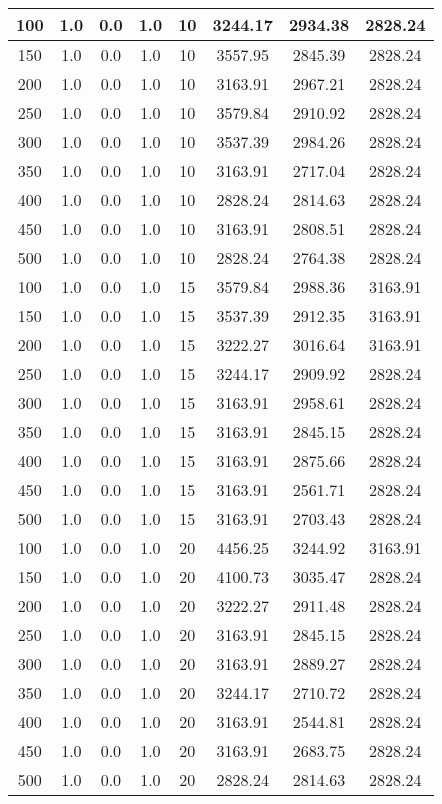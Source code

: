 \documentclass[a4paper, 12pt]{extreport}
\begin{document}
\begin{itemize}
\begin{longtable}{|c|c|c|c|c|c|c|c|}
			100 & 1.0 & 0.0 & 1.0 & 10 & 3244.17 & 2934.38 & 2828.24 \\\hline
			150 & 1.0 & 0.0 & 1.0 & 10 & 3557.95 & 2845.39 & 2828.24 \\\hline
			200 & 1.0 & 0.0 & 1.0 & 10 & 3163.91 & 2967.21 & 2828.24 \\\hline
			250 & 1.0 & 0.0 & 1.0 & 10 & 3579.84 & 2910.92 & 2828.24 \\\hline
			300 & 1.0 & 0.0 & 1.0 & 10 & 3537.39 & 2984.26 & 2828.24 \\\hline
			350 & 1.0 & 0.0 & 1.0 & 10 & 3163.91 & 2717.04 & 2828.24 \\\hline
			400 & 1.0 & 0.0 & 1.0 & 10 & 2828.24 & 2814.63 & 2828.24 \\\hline
			450 & 1.0 & 0.0 & 1.0 & 10 & 3163.91 & 2808.51 & 2828.24 \\\hline
			500 & 1.0 & 0.0 & 1.0 & 10 & 2828.24 & 2764.38 & 2828.24 \\\hline
			100 & 1.0 & 0.0 & 1.0 & 15 & 3579.84 & 2988.36 & 3163.91 \\\hline
			150 & 1.0 & 0.0 & 1.0 & 15 & 3537.39 & 2912.35 & 3163.91 \\\hline
			200 & 1.0 & 0.0 & 1.0 & 15 & 3222.27 & 3016.64 & 3163.91 \\\hline
			250 & 1.0 & 0.0 & 1.0 & 15 & 3244.17 & 2909.92 & 2828.24 \\\hline
			300 & 1.0 & 0.0 & 1.0 & 15 & 3163.91 & 2958.61 & 2828.24 \\\hline
			350 & 1.0 & 0.0 & 1.0 & 15 & 3163.91 & 2845.15 & 2828.24 \\\hline
			400 & 1.0 & 0.0 & 1.0 & 15 & 3163.91 & 2875.66 & 2828.24 \\\hline
			450 & 1.0 & 0.0 & 1.0 & 15 & 3163.91 & 2561.71 & 2828.24 \\\hline
			500 & 1.0 & 0.0 & 1.0 & 15 & 3163.91 & 2703.43 & 2828.24 \\\hline
			100 & 1.0 & 0.0 & 1.0 & 20 & 4456.25 & 3244.92 & 3163.91 \\\hline
			150 & 1.0 & 0.0 & 1.0 & 20 & 4100.73 & 3035.47 & 2828.24 \\\hline
			200 & 1.0 & 0.0 & 1.0 & 20 & 3222.27 & 2911.48 & 2828.24 \\\hline
			250 & 1.0 & 0.0 & 1.0 & 20 & 3163.91 & 2845.15 & 2828.24 \\\hline
			300 & 1.0 & 0.0 & 1.0 & 20 & 3163.91 & 2889.27 & 2828.24 \\\hline
			350 & 1.0 & 0.0 & 1.0 & 20 & 3244.17 & 2710.72 & 2828.24 \\\hline
			400 & 1.0 & 0.0 & 1.0 & 20 & 3163.91 & 2544.81 & 2828.24 \\\hline
			450 & 1.0 & 0.0 & 1.0 & 20 & 3163.91 & 2683.75 & 2828.24 \\\hline
			500 & 1.0 & 0.0 & 1.0 & 20 & 2828.24 & 2814.63 & 2828.24 \\\hline
		\end{longtable}
	\end{itemize}
\end{document}
